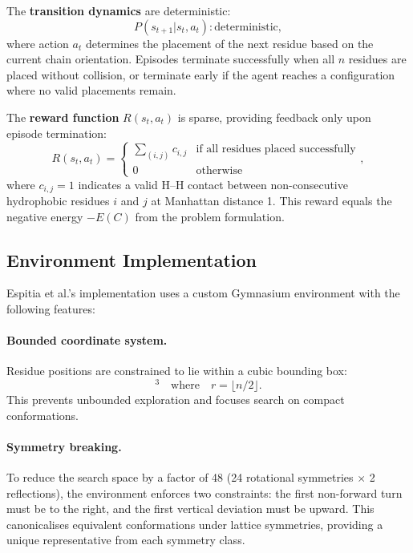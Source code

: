 \documentclass[12pt, oneside, openany]{book}
\theoremstyle{plain}
\theoremstyle{definition}
\begin{document}
The \textbf{transition dynamics} are deterministic:
\begin{equation}
P(s_{t+1} | s_t, a_t) : \text{deterministic},
\end{equation}
where action $a_t$ determines the placement of the next residue based on the current chain orientation. Episodes terminate successfully when all $n$ residues are placed without collision, or terminate early if the agent reaches a configuration where no valid placements remain.

The \textbf{reward function} $R(s_t, a_t)$ is sparse, providing feedback only upon episode termination:
\begin{equation}
R(s_t, a_t) = 
\begin{cases}
\sum_{(i,j)} c_{i,j} & \text{if all residues placed successfully} \\
0 & \text{otherwise}
\end{cases},
\end{equation}
where $c_{i,j} = 1$ indicates a valid H--H contact between non-consecutive hydrophobic residues $i$ and $j$ at Manhattan distance 1. This reward equals the negative energy $-E(C)$ from the problem formulation.

\subsection{Environment Implementation}

Espitia et al.'s implementation uses a custom Gymnasium environment with the following features:

\paragraph{Bounded coordinate system.} Residue positions are constrained to lie within a cubic bounding box:
\begin{equation}
[-r, r]^3 \quad \text{where} \quad r = \lfloor n/2 \rfloor.
\end{equation}
This prevents unbounded exploration and focuses search on compact conformations.

\paragraph{Symmetry breaking.} To reduce the search space by a factor of 48 (24 rotational symmetries $\times$ 2 reflections), the environment enforces two constraints: the first non-forward turn must be to the right, and the first vertical deviation must be upward. This canonicalises equivalent conformations under lattice symmetries, providing a unique representative from each symmetry class.
\end{document}
